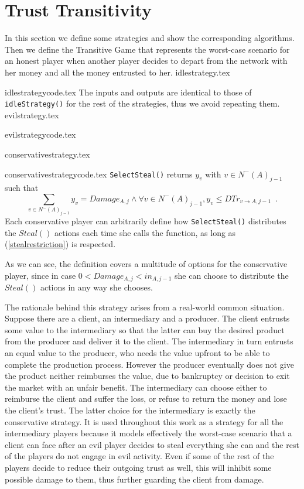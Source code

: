 \section{Trust Transitivity}
   In this section we define some strategies and show the corresponding algorithms. Then we define the
   Transitive Game that represents the worst-case scenario for an honest player when another player decides to depart from
   the network with her money and all the money entrusted to her.
   {idlestrategy.tex}

   {idlestrategycode.tex}
   The inputs and outputs are identical to those of \texttt{idleStrategy()} for the rest of the strategies, thus we avoid
   repeating them.
   {evilstrategy.tex}

   {evilstrategycode.tex}

   {conservativestrategy.tex}

   {conservativestrategycode.tex}
   \texttt{SelectSteal()} returns $y_v$ with $v \in N^{-}\left(A\right)_{j-1}$ such that
   \begin{equation}
   \label{stealrestriction}
      \sum\limits_{v \in N^{-}\left(A\right)_{j-1}}y_v = Damage_{A, j} \wedge \forall v \in N^{-}\left(A\right)_{j-1},
      y_v \leq DTr_{v \rightarrow A, j-1} \enspace.
   \end{equation}
   Each conservative player can arbitrarily define how \texttt{SelectSteal()} distributes the $Steal\left(\right)$ actions
   each time she calls the function, as long as (\ref{stealrestriction}) is respected. 

   As we can see, the definition covers a multitude of options for the conservative player, since in case $0 < Damage_{A,j}
   < in_{A,j-1}$ she can choose to distribute the $Steal\left(\right)$ actions in any way she chooses.

   The rationale behind this strategy arises from a real-world common situation. Suppose there are a client, an
   intermediary and a producer. The client entrusts some value to the intermediary so that the latter can buy the desired
   product from the producer and deliver it to the client. The intermediary in turn entrusts an equal value to the
   producer, who needs the value upfront to be able to complete the production process. However the producer eventually
   does not give the product neither reimburses the value, due to bankruptcy or decision to exit the market with an unfair
   benefit. The intermediary can choose either to reimburse the client and suffer the loss, or refuse to return the money
   and lose the client's trust. The latter choice for the intermediary is exactly the conservative strategy. It is used
   throughout this work as a strategy for all the intermediary players because it models effectively the worst-case
   scenario that a client can face after an evil player decides to steal everything she can and the rest of the players do
   not engage in evil activity. Even if some of the rest of the players decide to reduce their outgoing trust as well, this
   will inhibit some possible damage to them, thus further guarding the client from damage.

